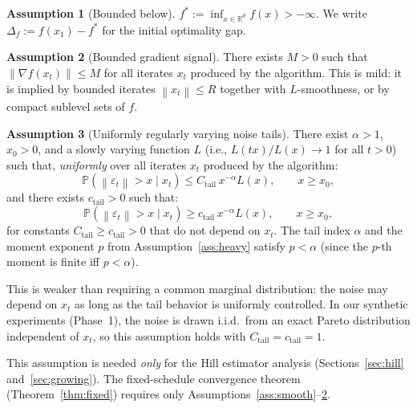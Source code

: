 \documentclass[11pt]{article}
\theoremstyle{definition}
\newtheorem{assumption}{Assumption}
\newcommand{\R}{\mathbb{R}}
\newcommand{\Prob}{\mathbb{P}}
\newcommand{\norm}[1]{\left\| #1 \right\|}
\begin{document}
\begin{assumption}[Bounded below]\label{ass:below}
$f^* := \inf_{x \in \R^d} f(x) > -\infty$.
We write $\Delta_f := f(x_1) - f^*$ for the initial optimality gap.
\end{assumption}

\begin{assumption}[Bounded gradient signal]\label{ass:signal}
There exists $M > 0$ such that $\norm{\nabla f(x_t)} \leq M$ for all
iterates $x_t$ produced by the algorithm. This is mild: it is implied by
bounded iterates $\norm{x_t} \leq R$ together with $L$-smoothness, or by
compact sublevel sets of $f$.
\end{assumption}

\begin{assumption}[Uniformly regularly varying noise tails]\label{ass:tail}
There exist $\alpha > 1$, $x_0 > 0$, and a slowly varying function $L$
(i.e., $L(tx)/L(x) \to 1$ for all $t > 0$) such that, \emph{uniformly}
over all iterates $x_t$ produced by the algorithm:
\[
  \Prob(\norm{\varepsilon_t} > x \mid x_t) \leq C_{\mathrm{tail}}\, x^{-\alpha} L(x),
  \qquad x \geq x_0,
\]
and there exists $c_{\mathrm{tail}} > 0$ such that:
\[
  \Prob(\norm{\varepsilon_t} > x \mid x_t) \geq c_{\mathrm{tail}}\, x^{-\alpha} L(x),
  \qquad x \geq x_0,
\]
for constants $C_{\mathrm{tail}} \geq c_{\mathrm{tail}} > 0$ that do not depend
on $x_t$. The tail index $\alpha$ and the moment exponent $p$ from
Assumption~\ref{ass:heavy} satisfy $p < \alpha$ (since the $p$-th moment
is finite iff $p < \alpha$).

This is weaker than requiring a common marginal distribution: the noise
may depend on $x_t$ as long as the tail behavior is uniformly controlled.
In our synthetic experiments (Phase~1), the noise is drawn i.i.d.\ from an
exact Pareto distribution independent of $x_t$, so this assumption holds
with $C_{\mathrm{tail}} = c_{\mathrm{tail}} = 1$.

This assumption is needed \emph{only} for the Hill estimator analysis
(Sections~\ref{sec:hill} and~\ref{sec:growing}). The fixed-schedule convergence
theorem (Theorem~\ref{thm:fixed}) requires only
Assumptions~\ref{ass:smooth}--\ref{ass:signal}.
\end{assumption}
\end{document}
